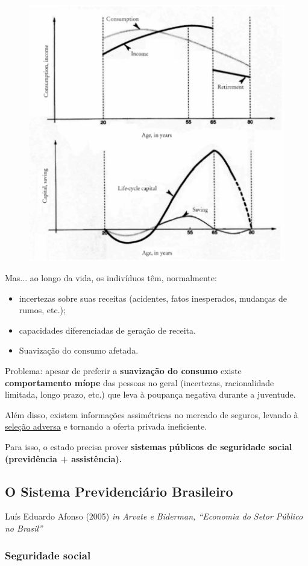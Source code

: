 \documentclass[a4paper,12pt]{article}[abntex2]
\begin{document}
\begin{figure}[H]
    \centering
    \includegraphics[width=0.6\linewidth]{Imagens/a16i5.png}
\end{figure}

Mas... ao longo da vida, os indivíduos têm, normalmente:\begin{itemize}
    \item incertezas sobre suas receitas (acidentes, fatos inesperados, mudanças de rumos, etc.);
    \item capacidades diferenciadas de geração de receita. 
    \item Suavização do consumo afetada. 
\end{itemize}

Problema: apesar de preferir a \textbf{suavização do consumo} existe \textbf{comportamento míope} das pessoas no geral (incertezas, racionalidade limitada, longo prazo, etc.) que leva à poupança negativa durante a juventude. 

Além disso, existem informações assimétricas no mercado de seguros, levando à \href{https://www.aeaweb.org/research/stopping-the-death-spiral}{seleção adversa} e tornando a oferta privada ineficiente.

Para isso, o estado precisa prover \textbf{sistemas públicos de seguridade social (previdência + assistência).}

\subsection{\textbf{O Sistema Previdenciário Brasileiro}}

Luís Eduardo Afonso (2005) \textit{in Arvate e Biderman, “Economia do Setor Público no Brasil”} 

\subsubsection{\textbf{Seguridade social}}
\end{document}
